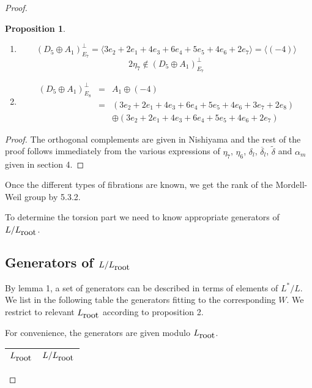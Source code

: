 \documentclass{amsart}
\newtheorem{proposition}{Proposition}
\begin{document}
\begin{proof}
\begin{proposition}
\begin{enumerate}
$$(D_5 \oplus A_1 )_{D_{16}}^{\perp}=A_1\oplus D_9 \,\,\,\,\,\,\,\,(D_5 \oplus A_1 )_{D_{24}}^{\perp}=A_1\oplus D_{17}$$
\item
$$(D_5\oplus A_1)_{E_7}^{\perp} = \langle 3e_2+2e_1+4e_3+6e_4+5e_5+4e_6+2e_7\rangle =\langle (-4)\rangle$$
$$2\eta_7 \notin (D_5 \oplus A_1)_{E_7}^{\perp}$$
\item
$$
\begin{array}{lll}
(D_5 \oplus A_1 )_{E_8}^{\perp} & = & A_1\oplus (-4) \\
                                 &  = & (3e_2+2e_1+4e_3+6e_4+5e_5+4e_6+3e_7+2e_8)\\
  &  & \oplus (3e_2+2e_1+4e_3+6e_4+5e_5+4e_6+2e_7)  
\end{array}
$$
\end{enumerate}

\end{proposition}


\begin{proof}

The orthogonal complements are given in Nishiyama \cite{Nis} and the rest of the proof follows immediately from the various expressions of $\eta_7$, $\eta_6$, $\delta_l$, $\overline{\delta}_l$, $\tilde{\delta}$ and $\alpha_m$ given in section 4.





\end{proof}

Once the different types of fibrations are known, we get the rank of the Mordell-Weil group by 5.3.2.


To determine the torsion part we need to know appropriate generators of  $L/L_{\hbox{root}}$. 

\subsection{Generators of $L/L_{\hbox{root}}$}
By lemma 1, a set of generators can be described in terms of elements of $L^*/L$. We list in the following table the generators fitting to the corresponding $W$. We restrict to relevant $L_{\hbox{root}}$ according to proposition 2.


For convenience, the generators are given modulo $L_{\hbox{root}}$.


\begin{center}
\begin{tabular}{|l|c|}
\hline
   
\rule{0cm}{0.5cm}$L_{\hbox{root}}$ & $L/L_{\hbox{root}}$ \\ \hline
   

\end{tabular}
\end{center}
\end{proof}
\end{document}
